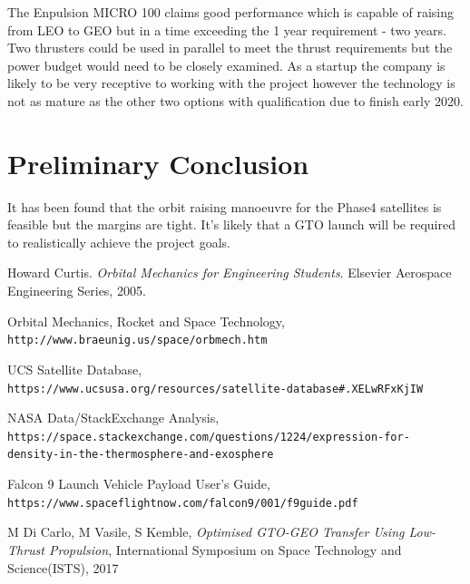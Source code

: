 \documentclass[a4paper, article, oneside, UKenglish]{memoir}
\newcommand{\0}{\mathbf{0}}
\newcommand{\1}{\mathbf{1}}
\begin{document}
The Enpulsion MICRO 100 claims good performance which is capable of raising from LEO to GEO but in a time exceeding the 1 year requirement - two years.  Two thrusters could be used in parallel to meet the thrust requirements but the power budget would need to be closely examined.  As a startup the company is likely to be very receptive to working with the project however the technology is not as mature as the other two options with qualification due to finish early 2020.

\chapter{Preliminary Conclusion}

It has been found that the orbit raising manoeuvre for the Phase4 satellites is feasible but the margins are tight.  It's likely that a GTO launch will be required to realistically achieve the project goals.

\newpage
\begin{thebibliography}{9}

	Howard Curtis.
	\textit{Orbital Mechanics for Engineering Students}. 
	Elsevier Aerospace Engineering Series, 2005.

	Orbital Mechanics, Rocket and Space Technology,
	\\\texttt{http://www.braeunig.us/space/orbmech.htm}
	
	UCS Satellite Database,
	\\\texttt{https://www.ucsusa.org/resources/satellite-database\#.XELwRFxKjIW}
	
	NASA Data/StackExchange Analysis,
	\\\texttt{https://space.stackexchange.com/questions/1224/expression-for-\\
	density-in-the-thermosphere-and-exosphere}
	
	Falcon 9 Launch Vehicle Payload User’s Guide,
	\\\texttt{https://www.spaceflightnow.com/falcon9/001/f9guide.pdf}
	
	M Di Carlo, M Vasile, S Kemble, \textit{Optimised GTO-GEO Transfer Using Low-Thrust Propulsion}, 
	International Symposium on Space Technology and Science(ISTS), 2017


\end{thebibliography}
\end{document}
